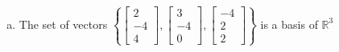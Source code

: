 \begin{exerciseAnswer}
\begin{enumerate}[(a)]
\item The set of vectors \( \left\{ \left[\begin{array}{c}
2 \\
-4 \\
4
\end{array}\right] , \left[\begin{array}{c}
3 \\
-4 \\
0
\end{array}\right] , \left[\begin{array}{c}
-4 \\
2 \\
2
\end{array}\right] \right\} \) is a basis of \(\mathbb{R}^3\)
\end{enumerate}
    
\end{exerciseAnswer}
    
